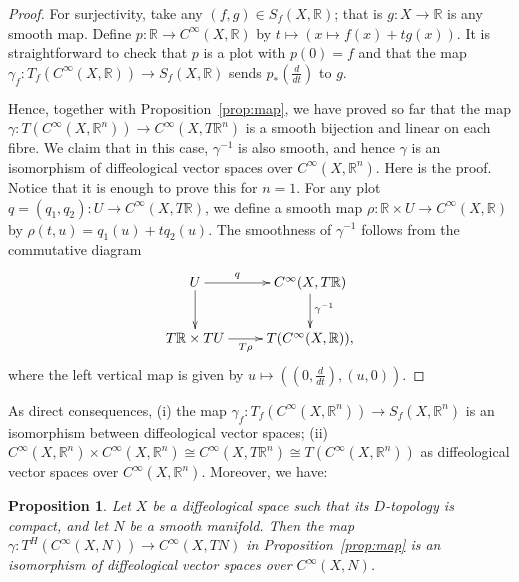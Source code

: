 \documentclass[12pt]{amsart}
\newtheorem{prop}[de]{Proposition}
\theoremstyle{remark}
\newcommand{\ra}{\to}
\def \R{\mathbb{R}}
\begin{document}
\begin{proof}
For surjectivity,
take any $(f,g) \in S_f(X,\R)$; that is $g:X \ra \R$ is any smooth map.
Define $p:\R \ra C^\infty(X,\R)$ by $t \mapsto (x \mapsto f(x)+tg(x))$.
It is straightforward to check that $p$ is a plot with $p(0)=f$ and
that the map $\gamma_f:T_f(C^\infty(X,\R)) \ra S_f(X,\R)$
sends $p_*(\frac{d}{dt})$ to $g$.

Hence, together with Proposition~\ref{prop:map},
we have proved so far that the  map $\gamma:T(C^\infty(X,\R^n)) \ra C^\infty(X,T\R^n)$
is a smooth bijection and linear on each fibre.
We claim that in this case, $\gamma^{-1}$ is also smooth, and hence
$\gamma$ is an isomorphism of diffeological vector spaces over $C^\infty(X,\R^n)$.
Here is the proof.
Notice that it is enough to prove this for $n=1$.
For any plot $q=(q_1,q_2):U \ra C^\infty(X,T\R)$, we define
a smooth map $\rho:\R \times U \ra C^\infty(X,\R)$
by $\rho(t,u)=q_1(u)+tq_2(u)$.
The smoothness of $\gamma^{-1}$ follows from the commutative diagram
\[
\xymatrix{U \ar[d] \ar[r]^-q & C^\infty(X,T\R) \ar[d]^(0.45){\gamma^{-1}} \\ T\R \times TU \ar[r]_-{T\rho} & T(C^\infty(X,\R)),}
\]
where the left vertical map is given by $u \mapsto ((0,\frac{d}{dt}),(u,0))$.
\end{proof}

As direct consequences,
(i) the map $\gamma_f:T_f(C^\infty(X,\R^n)) \ra S_f(X,\R^n)$ is
an isomorphism between diffeological vector spaces;
(ii) $C^\infty(X,\R^n) \times C^\infty(X,\R^n) \cong C^\infty(X,T\R^n) \cong
T(C^\infty(X,\R^n))$ as diffeological vector spaces over $C^\infty(X,\R^n)$.
Moreover, we have:

\begin{prop}\label{prop:cpt}
Let $X$ be a diffeological space such that its $D$-topology is compact,
and let $N$ be a smooth manifold.
Then the map $\gamma:T^H(C^\infty(X,N)) \ra C^\infty(X,TN)$ in
Proposition~\ref{prop:map} is an isomorphism of diffeological vector
spaces over $C^\infty(X,N)$.
\end{prop}
\end{document}
